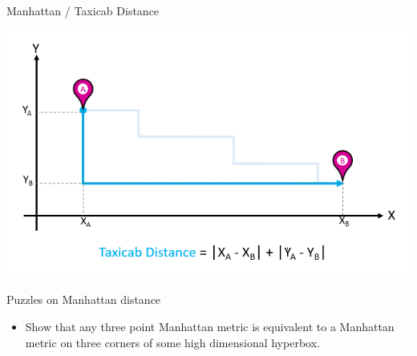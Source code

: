 \begin{frame}{Manhattan / Taxicab Distance}
   \begin{center}
     \includegraphics[width=1\textwidth]{figs/taxicab.png}
   \end{center}
\end{frame}



\begin{frame}{Puzzles on Manhattan distance}
  \begin{itemize}[<+->]
  \item Show that any three point Manhattan metric is
    equivalent to a Manhattan metric on three corners of some high
      dimensional hyperbox.
  \end{itemize}
\end{frame}



